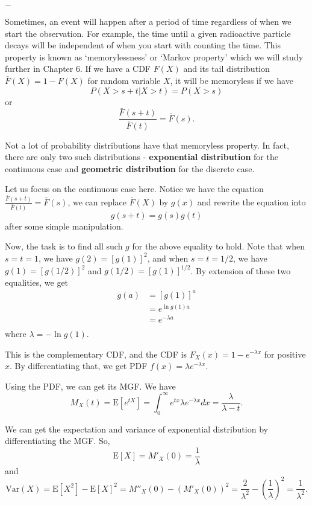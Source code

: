 \documentclass[11pt, a4paper, oneside]{book}
\theoremstyle{definition}
\newcommand{\var}[1]{\text{Var}(#1)}
\newcommand{\E}[1]{\text{E}[#1]}
\newcommand{\breaking}{%
    \begin{center}
    $-$
    \end{center}%
}
\begin{document}
\breaking

\noindent Sometimes, an event will happen after a period of time regardless of when we start the observation. For example, the time until a given radioactive particle decays will be independent of when you start with counting the time. This property is known as `memorylessness' or `Markov property' which we will study further in Chapter 6. If we have a CDF $F(X)$ and its tail distribution $\bar{F}(X) = 1 - F(X)$ for random variable $X$, it will be memoryless if we have\[
P(X>s+t | X>t) = P(X>s)
\]
or \[
\frac{\bar{F}(s+t)}{\bar{F}(t)} = \bar{F}(s).
\]

\noindent Not a lot of probability distributions have that memoryless property. In fact, there are only two such distributions - \textbf{exponential distribution} for the continuous case and \textbf{geometric distribution} for the discrete case. 

\noindent Let us focus on the continuous case here. Notice we have the equation $\frac{\bar{F}(s+t)}{\bar{F}(t)} = \bar{F}(s)$, we can replace $\bar{F}(X)$ by $g(x)$ and rewrite the equation into\[
g(s+t) = g(s)g(t)
\]
after some simple manipulation. 

\noindent Now, the task is to find all such $g$ for the above equality to hold. Note that when $s=t=1$, we have $g(2) = [g(1)]^2$, and when $s=t=1/2$, we have $g(1) = [g(1/2)]^2$ and $g(1/2) = [g(1)]^{1/2}$. By extension of these two equalities, we get 
\begin{equation*}
\begin{split}
g(a) &= [g(1)]^a \\
&= e^{\ln{g(1)}a} \\
&= e^{-\lambda a} \\
\end{split}
\end{equation*}
where $\lambda = -\ln{g(1)}$. 

\noindent This is the complementary CDF, and the CDF is $F_X(x) = 1 - e^{-\lambda x}$ for positive $x$. By differentiating that, we get PDF $f(x) = \lambda e^{-\lambda x}$.

\noindent Using the PDF, we can get its MGF. We have\[
M_X(t) = \E{e^{tX}} = \int^{\infty}_{0} e^{tx}\lambda e^{-\lambda x} dx = \frac{\lambda}{\lambda - t}.
\]

\noindent We can get the expectation and variance of exponential distribution by differentiating the MGF. So, \[
\E{X} =  M'_X(0) = \frac{1}{\lambda} 
\]
and 
\begin{equation*}
\var{X} = \E{X^2} - \E{X}^2 = M''_X(0) -  (M'_X(0))^2 = \frac{2}{\lambda^2} - (\frac{1}{\lambda} )^2 = \frac{1}{\lambda^2}. 
\end{equation*}
\end{document}
